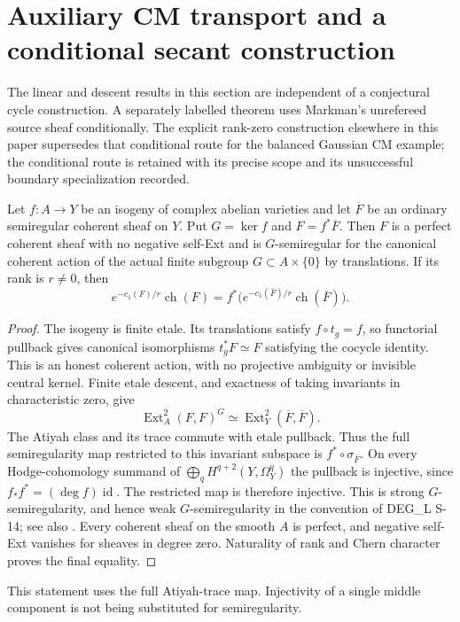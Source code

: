 \section{Auxiliary CM transport and a conditional secant construction}
\label{sec:cm-transport}

The linear and descent results in this section are independent of a
conjectural cycle construction. A separately labelled theorem uses
Markman's unrefereed source sheaf conditionally. The explicit
rank-zero construction elsewhere in this paper supersedes that
conditional route for the balanced Gaussian CM example; the conditional
route is retained with its precise scope and its unsuccessful boundary
specialization recorded.

\begin{proposition}
\label{SF-CM01}
Let $f:A\to Y$ be an isogeny of complex abelian varieties and let
$\overline F$ be an ordinary semiregular coherent sheaf on $Y$.
Put $G=\ker f$ and $F=f^*\overline F$. Then $F$ is a perfect
coherent sheaf with no negative self-Ext and is $G$-semiregular for
the canonical coherent action of the actual finite subgroup
$G\subset A\times\{0\}$ by translations. If its rank is $r\ne0$,
then
\[
 e^{-c_1(F)/r}\operatorname{ch}(F)
 =f^*\bigl(e^{-c_1(\overline F)/r}\operatorname{ch}(\overline F)\bigr).
\]
\end{proposition}
\begin{proof}
The isogeny is finite etale. Its translations satisfy $f\circ t_g=f$,
so functorial pullback gives canonical isomorphisms $t_g^*F\simeq F$
satisfying the cocycle identity. This is an honest coherent action,
with no projective ambiguity or invisible central kernel. Finite
etale descent, and exactness of taking invariants in characteristic
zero, give
\[
 \operatorname{Ext}^2_A(F,F)^G
 \simeq\operatorname{Ext}^2_Y(\overline F,\overline F).
\]
The Atiyah class and its trace commute with etale pullback. Thus the
full semiregularity map restricted to this invariant subspace is
$f^*\circ\sigma_{\overline F}$. On every Hodge-cohomology summand
of $\bigoplus_qH^{q+2}(Y,\Omega_Y^q)$ the pullback is injective,
since $f_*f^*=(\deg f)\operatorname{id}$. The restricted map is
therefore injective. This is strong $G$-semiregularity, and hence
weak $G$-semiregularity in the convention of DEG\_L S-14; see also
\cite[Definition~2.6 and Lemma~2.7, pp.~5--6]{SF-Perry2604}.
Every coherent sheaf on the smooth $A$ is perfect, and negative
self-Ext vanishes for sheaves in degree zero. Naturality of rank and
Chern character proves the final equality.
\end{proof}
This statement uses the full Atiyah-trace map. Injectivity of a
single middle component is not being substituted for semiregularity.

